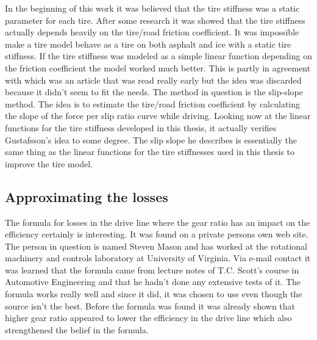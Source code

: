 In the beginning of this work it was believed that the tire stiffness was a static parameter for each tire. After some research it was showed that the tire stiffness actually depends heavily on the tire/road friction coefficient. It was impossible make a tire model behave as a tire on both asphalt and ice with a static tire stiffness. If the tire stiffness was modeled as a simple linear function depending on the friction coefficient the model worked much better. This is partly in agreement with \cite{gustafsson1997} which was an article that was read really early but the idea was discarded because it didn't seem to fit the needs. The method in question is the slip-slope method. The idea is to estimate the tire/road friction coefficient by calculating the slope of the force per slip ratio curve while driving. Looking now at the linear functions for the tire stiffness developed in this thesis, it actually verifies Gustafsson's idea to some degree. The slip slope he describes is essentially the same thing as the linear functions for the tire stiffnesses used in this thesis to improve the tire model.


\subsection{Approximating the losses}
The formula for losses in the drive line where the gear ratio has an impact on the efficiency certainly is interesting. It was found on a private persons own web site. The person in question is named Steven Mason and has worked at the rotational machinery and controls laboratory at University of Virginia. Via e-mail contact it was learned that the formula came from lecture notes of T.C. Scott's course in Automotive Engineering and that he hadn't done any extensive tests of it. The formula works really well and since it did, it was chosen to use even though the source isn't the best. Before the formula was found it was already shown that higher gear ratio appeared to lower the efficiency in the drive line which also strengthened the belief in the formula. 


